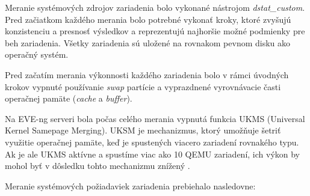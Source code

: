 
Meranie systémových zdrojov zariadenia bolo vykonané nástrojom \emph{dstat\_custom}. Pred začiatkom každého merania bolo potrebné vykonať kroky, ktoré zvyšujú konzistenciu a presnosť výsledkov a reprezentujú najhoršie možné podmienky pre beh zariadenia. Všetky zariadenia sú uložené na rovnakom pevnom disku ako operačný systém.

Pred začatím merania výkonnosti každého zariadenia bolo v rámci úvodných krokov vypnuté používanie \emph{swap} partície a vyprazdnené vyrovnávacie časti operačnej pamäte (\emph{cache} a \emph{buffer}).

Na EVE-ng serveri bola počas celého merania vypnutá funkcia UKMS (Universal Kernel Samepage Merging). UKSM je mechanizmus, ktorý umožňuje šetriť využitie operačnej pamäte, keď je spustených viacero zariadení rovnakého typu. Ak je ale UKMS aktívne a spustíme viac ako 10 QEMU zariadení, ich výkon by mohol byť v dôsledku tohto mechanizmu znížený \cite{eve_ng_faq}.

\noindent
Meranie systémových požiadaviek zariadenia prebiehalo nasledovne:

